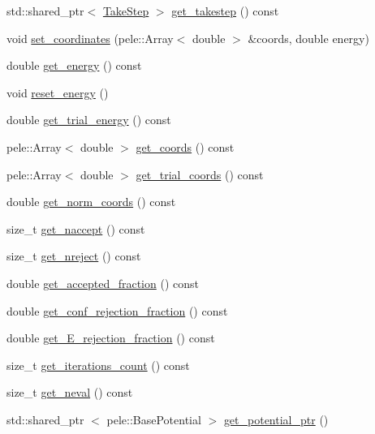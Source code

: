 \begin{DoxyCompactItemize}
\item 
std\-::shared\-\_\-ptr$<$ \hyperlink{classmcpele_1_1TakeStep}{\-Take\-Step} $>$ \hyperlink{classmcpele_1_1MC_aa5207841480b9a6d11699babf63aa95e}{get\-\_\-takestep} () const 
\item 
void \hyperlink{classmcpele_1_1MC_a5df3e0f95cbe02e4e7ee2e3bb7654dff}{set\-\_\-coordinates} (pele\-::\-Array$<$ double $>$ \&coords, double energy)
\item 
double \hyperlink{classmcpele_1_1MC_ac538a56ea555f102fc4fe347f9ff40c3}{get\-\_\-energy} () const 
\item 
void \hyperlink{classmcpele_1_1MC_ad3ec3d5ae30a44ed5a7f832a1c570b63}{reset\-\_\-energy} ()
\item 
double \hyperlink{classmcpele_1_1MC_a67f441e23995e82288fd9e44072c8efe}{get\-\_\-trial\-\_\-energy} () const 
\item 
pele\-::\-Array$<$ double $>$ \hyperlink{classmcpele_1_1MC_a37869df5487d535a9a4515492cd7a056}{get\-\_\-coords} () const 
\item 
pele\-::\-Array$<$ double $>$ \hyperlink{classmcpele_1_1MC_a1ba8a6e2d26b1124fa4707ad7397a024}{get\-\_\-trial\-\_\-coords} () const 
\item 
double \hyperlink{classmcpele_1_1MC_a61bb33c1cfd7e7f1caa96ae9f9af79f1}{get\-\_\-norm\-\_\-coords} () const 
\item 
size\-\_\-t \hyperlink{classmcpele_1_1MC_a6a2355df19783573a6d15294cce4fd43}{get\-\_\-naccept} () const 
\item 
size\-\_\-t \hyperlink{classmcpele_1_1MC_a5c9f22a57a3e9cc0228c7f84acd8ec7f}{get\-\_\-nreject} () const 
\item 
double \hyperlink{classmcpele_1_1MC_a5a2cf1de51e632cd845002299f6d2e9f}{get\-\_\-accepted\-\_\-fraction} () const 
\item 
double \hyperlink{classmcpele_1_1MC_a83bfebc60ee7a0db945aeeeaede84181}{get\-\_\-conf\-\_\-rejection\-\_\-fraction} () const 
\item 
double \hyperlink{classmcpele_1_1MC_acfb4b64a6a339518c2a12a30b5f6b069}{get\-\_\-\-E\-\_\-rejection\-\_\-fraction} () const 
\item 
size\-\_\-t \hyperlink{classmcpele_1_1MC_a9a8e8b2c4a9e77b5136c9a3c1b67bb9c}{get\-\_\-iterations\-\_\-count} () const 
\item 
size\-\_\-t \hyperlink{classmcpele_1_1MC_a656ec94034cc412e819438d21f7fcfa3}{get\-\_\-neval} () const 
\item 
std\-::shared\-\_\-ptr\*
$<$ pele\-::\-Base\-Potential $>$ \hyperlink{classmcpele_1_1MC_a1e0731055ab95e94142cd0c20fce2daf}{get\-\_\-potential\-\_\-ptr} ()

\end{DoxyCompactItemize}
